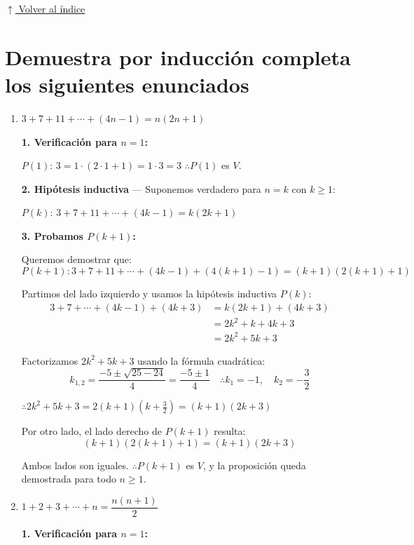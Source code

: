 \documentclass[12pt]{article}
\newcommand{\volverindice}{%
    \vspace{1em}%
    \begin{flushright}%
        \hyperlink{indice}{\small $\uparrow$ Volver al índice}%
    \end{flushright}%
}
\begin{document}
\volverindice
\newpage


\section[Inducción completa]{Demuestra por inducción completa los siguientes enunciados}

\begin{enumerate}[label=\alph*.-]

    \item $3 + 7 + 11 + \cdots + (4n-1) = n(2n+1)$

    \textbf{1. Verificación para $n = 1$:}

    $P(1)$: $3 = 1 \cdot (2 \cdot 1 + 1) = 1 \cdot 3 = 3$ \quad $\therefore P(1)$ es $V$.

    \textbf{2. Hipótesis inductiva} — Suponemos verdadero para $n = k$ con $k \geq 1$:

    $P(k)$: $3 + 7 + 11 + \cdots + (4k-1) = k(2k+1)$

    \textbf{3. Probamos $P(k+1)$:}

    Queremos demostrar que:
    \[P(k+1): 3 + 7 + 11 + \cdots + (4k-1) + (4(k+1)-1) = (k+1)(2(k+1)+1)\]

    Partimos del lado izquierdo y usamos la hipótesis inductiva $P(k)$:
    \begin{align*}
        3 + 7 + \cdots + (4k-1) + (4k+3) &= k(2k+1) + (4k+3) \\
        &= 2k^2 + k + 4k + 3 \\
        &= 2k^2 + 5k + 3
    \end{align*}

    Factorizamos $2k^2 + 5k + 3$ usando la fórmula cuadrática:
    \[k_{1,2} = \frac{-5 \pm \sqrt{25 - 24}}{4} = \frac{-5 \pm 1}{4} \quad \therefore k_1 = -1, \quad k_2 = -\frac{3}{2}\]

    $\therefore 2k^2 + 5k + 3 = 2(k+1)\left(k + \frac{3}{2}\right) = (k+1)(2k+3)$

    Por otro lado, el lado derecho de $P(k+1)$ resulta:
    \[(k+1)(2(k+1)+1) = (k+1)(2k+3)\]

    Ambos lados son iguales. $\therefore P(k+1)$ es $V$, y la proposición queda demostrada para todo $n \geq 1$.

    \item $1 + 2 + 3 + \cdots + n = \dfrac{n(n+1)}{2}$

    \textbf{1. Verificación para $n = 1$:}


\end{enumerate}
\end{document}
